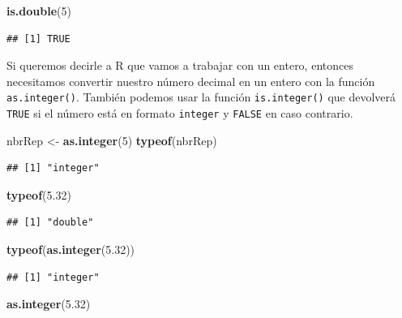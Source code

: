 \documentclass[
]{book}
\newenvironment{Shaded}{\begin{snugshade}}{\end{snugshade}}
\newcommand{\DecValTok}[1]{\textcolor[rgb]{0.00,0.00,0.81}{#1}}
\newcommand{\FloatTok}[1]{\textcolor[rgb]{0.00,0.00,0.81}{#1}}
\newcommand{\KeywordTok}[1]{\textcolor[rgb]{0.13,0.29,0.53}{\textbf{#1}}}
\newcommand{\NormalTok}[1]{#1}
\newcommand{\StringTok}[1]{\textcolor[rgb]{0.31,0.60,0.02}{#1}}
\begin{document}
\begin{Shaded}
\begin{Highlighting}[]
\KeywordTok{is.double}\NormalTok{(}\DecValTok{5}\NormalTok{)}
\end{Highlighting}
\end{Shaded}

\begin{verbatim}
## [1] TRUE
\end{verbatim}

Si queremos decirle a R que vamos a trabajar con un entero, entonces necesitamos convertir nuestro número decimal en un entero con la función \texttt{as.integer()}. También podemos usar la función \texttt{is.integer()} que devolverá \texttt{TRUE} si el número está en formato \texttt{integer} y \texttt{FALSE} en caso contrario.

\begin{Shaded}
\begin{Highlighting}[]
\NormalTok{nbrRep <-}\StringTok{ }\KeywordTok{as.integer}\NormalTok{(}\DecValTok{5}\NormalTok{)}
\KeywordTok{typeof}\NormalTok{(nbrRep)}
\end{Highlighting}
\end{Shaded}

\begin{verbatim}
## [1] "integer"
\end{verbatim}

\begin{Shaded}
\begin{Highlighting}[]
\KeywordTok{typeof}\NormalTok{(}\FloatTok{5.32}\NormalTok{)}
\end{Highlighting}
\end{Shaded}

\begin{verbatim}
## [1] "double"
\end{verbatim}

\begin{Shaded}
\begin{Highlighting}[]
\KeywordTok{typeof}\NormalTok{(}\KeywordTok{as.integer}\NormalTok{(}\FloatTok{5.32}\NormalTok{))}
\end{Highlighting}
\end{Shaded}

\begin{verbatim}
## [1] "integer"
\end{verbatim}

\begin{Shaded}
\begin{Highlighting}[]
\KeywordTok{as.integer}\NormalTok{(}\FloatTok{5.32}\NormalTok{)}
\end{Highlighting}
\end{Shaded}
\end{document}
